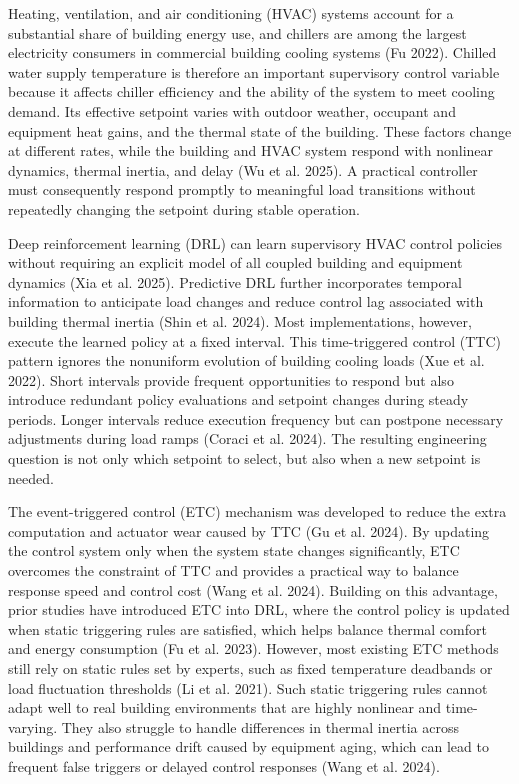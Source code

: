 \documentclass[preprint,12pt]{elsarticle}
\begin{document}
Heating, ventilation, and air conditioning (HVAC) systems account for a substantial share of building energy use, and chillers are among the largest electricity consumers in commercial building cooling systems (Fu 2022). Chilled water supply temperature is therefore an important supervisory control variable because it affects chiller efficiency and the ability of the system to meet cooling demand. Its effective setpoint varies with outdoor weather, occupant and equipment heat gains, and the thermal state of the building. These factors change at different rates, while the building and HVAC system respond with nonlinear dynamics, thermal inertia, and delay (Wu et al. 2025). A practical controller must consequently respond promptly to meaningful load transitions without repeatedly changing the setpoint during stable operation.

Deep reinforcement learning (DRL) can learn supervisory HVAC control policies without requiring an explicit model of all coupled building and equipment dynamics (Xia et al. 2025). Predictive DRL further incorporates temporal information to anticipate load changes and reduce control lag associated with building thermal inertia (Shin et al. 2024). Most implementations, however, execute the learned policy at a fixed interval. This time-triggered control (TTC) pattern ignores the nonuniform evolution of building cooling loads (Xue et al. 2022). Short intervals provide frequent opportunities to respond but also introduce redundant policy evaluations and setpoint changes during steady periods. Longer intervals reduce execution frequency but can postpone necessary adjustments during load ramps (Coraci et al. 2024). The resulting engineering question is not only which setpoint to select, but also when a new setpoint is needed.

The event-triggered control (ETC) mechanism was developed to reduce the extra computation and actuator wear caused by TTC (Gu et al. 2024). By updating the control system only when the system state changes significantly, ETC overcomes the constraint of TTC and provides a practical way to balance response speed and control cost (Wang et al. 2024). Building on this advantage, prior studies have introduced ETC into DRL, where the control policy is updated when static triggering rules are satisfied, which helps balance thermal comfort and energy consumption (Fu et al. 2023). However, most existing ETC methods still rely on static rules set by experts, such as fixed temperature deadbands or load fluctuation thresholds (Li et al. 2021). Such static triggering rules cannot adapt well to real building environments that are highly nonlinear and time-varying. They also struggle to handle differences in thermal inertia across buildings and performance drift caused by equipment aging, which can lead to frequent false triggers or delayed control responses (Wang et al. 2024).
\end{document}
